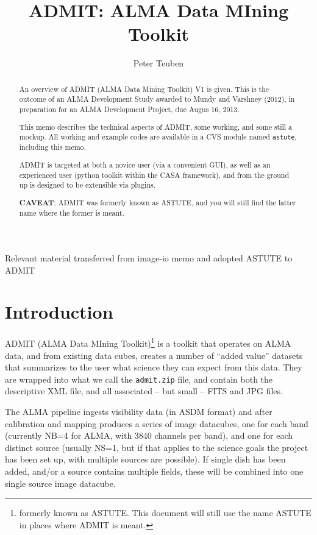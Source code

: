 \documentclass[preprint]{aastex} %
\begin{document}

\title{ADMIT: ALMA Data MIning Toolkit}

\author{Peter Teuben}

\begin{abstract}

An overview of ADMIT (ALMA Data Mining Toolkit) V1 is given. This is
the outcome of an ALMA Development Study awarded to Mundy and Varshney
(2012), in preparation for an ALMA Development Project, due Augus 16,
2013.

This memo describes the technical aspects of ADMIT, some working, and
some still a mockup. All working and example codes are available in a
CVS module named {\tt astute}, including this memo.

ADMIT is targeted at both a novice user (via a convenient GUI), as
well as an experienced user (python toolkit within the CASA
framework), and from the ground up is designed to be extensible via
plugins.

{\bf CAVEAT}: ADMIT was formerly known as ASTUTE, and you will still
find the latter name where the former is meant.


\end{abstract}


\ChangeRecordBegin
{}
{Relevant material transferred from image-io memo and adopted ASTUTE to ADMIT}
\ChangeRecordEnd


\section{Introduction}

ADMIT (ALMA Data MIning Toolkit)\footnote{formerly known as ASTUTE. 
This document will still use the name ASTUTE in places where ADMIT is meant.}
is a toolkit that operates on ALMA data, and from existing data cubes, 
creates a number of ``added value'' datasets that summarizes to the user
what science they can expect from this data. They are wrapped into what
we call the {\tt admit.zip} file, and contain both the descriptive XML
file, and all associated -- but small -- FITS and JPG files.

The ALMA pipeline ingests visibility data (in ASDM format) and after calibration
and mapping produces a series of image datacubes, one for each band (currently 
NB=4 for ALMA, with 3840 channels per band), and one for each distinct
source (usually NS=1, but if that applies to the science 
goals the project has been set up, with multiple sources are possible). If
single dish has been added, and/or a source contains multiple fields,
these will be combined into one single source image datacube.
\end{document}
